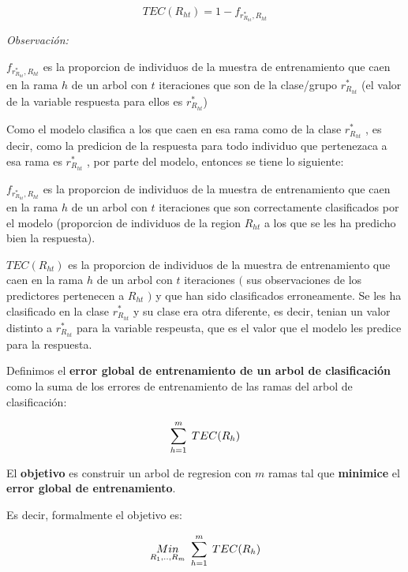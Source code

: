 \documentclass[
  11pt,
  a4paper,
]{article}
\begin{document}
\[TEC(R_{ht}) = 1 - f_{r^*_{R_{ht}} , R_{ht}}\]

\vspace{0.35cm}

\emph{Observación:}

\(f_{r^*_{R_{ht}} , R_{ht}}\) es la proporcion de individuos de la
muestra de entrenamiento que caen en la rama \(h\) de un arbol con \(t\)
iteraciones que son de la clase/grupo \(r^*_{R_{ht}}\) (el valor de la
variable respuesta para ellos es \(r^*_{R_{ht}}\))

Como el modelo clasifica a los que caen en esa rama como de la clase
\(r^*_{R_{ht}}\) , es decir, como la predicion de la respuesta para todo
individuo que pertenezaca a esa rama es \(r^*_{R_{ht}}\) , por parte del
modelo, entonces se tiene lo siguiente:

\(f_{r^*_{R_{ht}} , R_{ht}}\) es la proporcion de individuos de la
muestra de entrenamiento que caen en la rama \(h\) de un arbol con \(t\)
iteraciones que son correctamente clasificados por el modelo (proporcion
de individuos de la region \(R_{ht}\) a los que se les ha predicho bien
la respuesta).

\(TEC(R_{ht})\) es la proporcion de individuos de la muestra de
entrenamiento que caen en la rama \(h\) de un arbol con \(t\)
iteraciones \((\) sus observaciones de los predictores pertenecen a
\(R_{ht}\) \()\) y que han sido clasificados erroneamente. Se les ha
clasificado en la clase \(r^*_{R_{ht}}\) y su clase era otra diferente,
es decir, tenian un valor distinto a \(r^*_{R_{ht}}\) para la variable
respeusta, que es el valor que el modelo les predice para la respuesta.

\vspace{0.35cm}

Definimos el \textbf{error global de entrenamiento de un arbol de
clasificación} como la suma de los errores de entrenamiento de las ramas
del arbol de clasificación:

\[\sum_{h=1}^{m} \hspace{0.1cm} TEC(R_h) \]

\vspace{0.35cm}

El \textbf{objetivo} es construir un arbol de regresion con \(m\) ramas
tal que \textbf{minimice} el \textbf{error global de entrenamiento}.

Es decir, formalmente el objetivo es:

\[ \underset{R_1,..,R_m}{Min}  \hspace{0.12cm}  \sum_{h=1}^{m} \hspace{0.1cm} TEC(R_h)  \]
\end{document}
